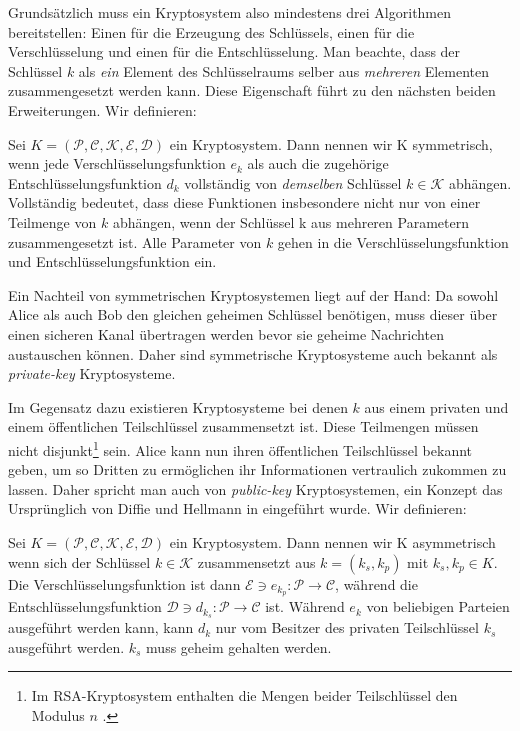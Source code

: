 Grundsätzlich muss ein Kryptosystem also mindestens drei Algorithmen bereitstellen: Einen für die Erzeugung des Schlüssels, einen für die Verschlüsselung und einen für die Entschlüsselung. Man beachte, dass der Schlüssel $k$ als \textit{ein} Element des Schlüsselraums selber aus \textit{mehreren} Elementen zusammengesetzt werden kann. Diese Eigenschaft führt zu den nächsten beiden Erweiterungen. Wir definieren:
\begin{theorem}
	Sei $K = (\mathcal{P},\mathcal{C},\mathcal{K},\mathcal{E},\mathcal{D})$ ein Kryptosystem. Dann nennen wir K symmetrisch, wenn jede Verschlüsselungsfunktion $e_k$ als auch die zugehörige Entschlüsselungsfunktion $d_k$ vollständig von \textit{demselben} Schlüssel $k\in\mathcal{K}$ abhängen. Vollständig bedeutet, dass diese Funktionen insbesondere nicht nur von einer Teilmenge von $k$ abhängen, wenn der Schlüssel k aus mehreren Parametern zusammengesetzt ist. Alle Parameter von $k$ gehen in die Verschlüsselungsfunktion und Entschlüsselungsfunktion ein.
\end{theorem}

Ein Nachteil von symmetrischen Kryptosystemen liegt auf der Hand: Da sowohl Alice als auch Bob den gleichen geheimen Schlüssel benötigen, muss dieser über einen sicheren Kanal übertragen werden bevor sie geheime Nachrichten austauschen können. Daher sind  symmetrische Kryptosysteme auch bekannt als \textit{private-key} Kryptosysteme.

Im Gegensatz dazu existieren Kryptosysteme bei denen $k$ aus einem privaten und einem öffentlichen Teilschlüssel zusammensetzt ist. Diese Teilmengen müssen nicht disjunkt\footnote{Im RSA-Kryptosystem enthalten die Mengen beider Teilschlüssel den Modulus $n$ \cite[p.6]{rivest1978method}.} sein. Alice kann nun ihren öffentlichen Teilschlüssel bekannt geben, um so Dritten zu ermöglichen ihr Informationen vertraulich zukommen zu lassen. Daher spricht man auch von \textit{public-key} Kryptosystemen, ein Konzept das Ursprünglich von Diffie und Hellmann in \cite[p.648]{diffie1976new} eingeführt wurde. Wir definieren:
\begin{theorem}
	Sei $K = (\mathcal{P},\mathcal{C},\mathcal{K},\mathcal{E},\mathcal{D})$ ein Kryptosystem. Dann nennen wir K asymmetrisch wenn sich der Schlüssel $k\in\mathcal{K}$ zusammensetzt aus $k=(k_s, k_p)$ mit $k_s,k_p\in K$. Die Verschlüsselungsfunktion ist dann $\mathcal{E}\ni e_{k_p}:\mathcal{P}\rightarrow\mathcal{C}$, während die Entschlüsselungsfunktion $\mathcal{D}\ni d_{k_s}:\mathcal{P}\rightarrow\mathcal{C}$ ist. Während $e_k$ von beliebigen Parteien ausgeführt werden kann, kann $d_k$ nur vom Besitzer des privaten Teilschlüssel $k_s$ ausgeführt werden. $k_s$ muss geheim gehalten werden.
\end{theorem}

